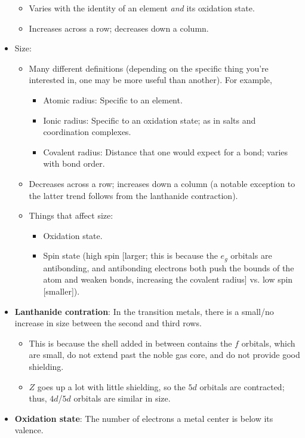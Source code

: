 \documentclass[../notes.tex]{subfiles}
\begin{document}
\begin{itemize}
\begin{itemize}
        \item Varies with the identity of an element \emph{and} its oxidation state.
        \item Increases across a row; decreases down a column.
    \end{itemize}
    \item Size:
    \begin{itemize}
        \item Many different definitions (depending on the specific thing you're interested in, one may be more useful than another). For example,
        \begin{itemize}
            \item Atomic radius: Specific to an element.
            \item Ionic radius: Specific to an oxidation state; as in salts and coordination complexes.
            \item Covalent radius: Distance that one would expect for a bond; varies with bond order.
        \end{itemize}
        \item Decreases across a row; increases down a column (a notable exception to the latter trend follows from the lanthanide contraction).
        \item Things that affect size:
        \begin{itemize}
            \item Oxidation state.
            \item Spin state (high spin [larger; this is because the $e_g$ orbitals are antibonding, and antibonding electrons both push the bounds of the atom and weaken bonds, increasing the covalent radius] vs. low spin [smaller]).
        \end{itemize}
    \end{itemize}
    \item \textbf{Lanthanide contration}: In the transition metals, there is a small/no increase in size between the second and third rows.
    \begin{itemize}
        \item This is because the shell added in between contains the $f$ orbitals, which are small, do not extend past the noble gas core, and do not provide good shielding.
        \item $Z$ goes up a lot with little shielding, so the $5d$ orbitals are contracted; thus, $4d$/$5d$ orbitals are similar in size.
    \end{itemize}
    \item \textbf{Oxidation state}: The number of electrons a metal center is below its valence.

\end{itemize}
\end{document}
